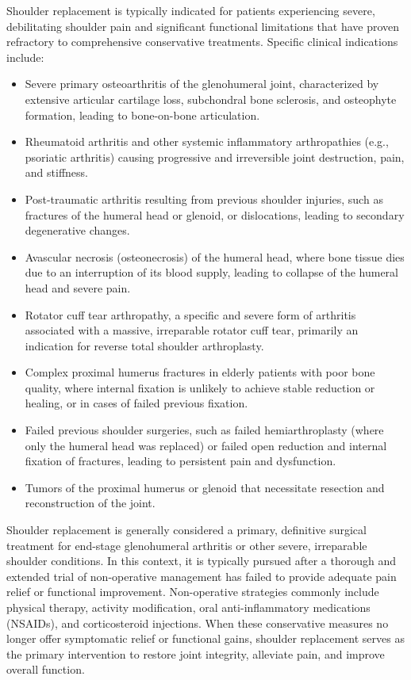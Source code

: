 Shoulder replacement is typically indicated for patients experiencing severe, debilitating shoulder pain and significant functional limitations that have proven refractory to comprehensive conservative treatments. Specific clinical indications include:
\begin{itemize}
  \item Severe primary osteoarthritis of the glenohumeral joint, characterized by extensive articular cartilage loss, subchondral bone sclerosis, and osteophyte formation, leading to bone-on-bone articulation.
  \item Rheumatoid arthritis and other systemic inflammatory arthropathies (e.g., psoriatic arthritis) causing progressive and irreversible joint destruction, pain, and stiffness.
  \item Post-traumatic arthritis resulting from previous shoulder injuries, such as fractures of the humeral head or glenoid, or dislocations, leading to secondary degenerative changes.
  \item Avascular necrosis (osteonecrosis) of the humeral head, where bone tissue dies due to an interruption of its blood supply, leading to collapse of the humeral head and severe pain.
  \item Rotator cuff tear arthropathy, a specific and severe form of arthritis associated with a massive, irreparable rotator cuff tear, primarily an indication for reverse total shoulder arthroplasty.
  \item Complex proximal humerus fractures in elderly patients with poor bone quality, where internal fixation is unlikely to achieve stable reduction or healing, or in cases of failed previous fixation.
  \item Failed previous shoulder surgeries, such as failed hemiarthroplasty (where only the humeral head was replaced) or failed open reduction and internal fixation of fractures, leading to persistent pain and dysfunction.
  \item Tumors of the proximal humerus or glenoid that necessitate resection and reconstruction of the joint.
\end{itemize}

Shoulder replacement is generally considered a primary, definitive surgical treatment for end-stage glenohumeral arthritis or other severe, irreparable shoulder conditions. In this context, it is typically pursued after a thorough and extended trial of non-operative management has failed to provide adequate pain relief or functional improvement. Non-operative strategies commonly include physical therapy, activity modification, oral anti-inflammatory medications (NSAIDs), and corticosteroid injections. When these conservative measures no longer offer symptomatic relief or functional gains, shoulder replacement serves as the primary intervention to restore joint integrity, alleviate pain, and improve overall function.

